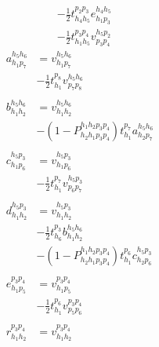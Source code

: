 \documentclass{article}
\begin{document}
{\begin{align}
                        &- \frac{1}{2} t ^{ p_{2} p_{3} } _{ h_{4} h_{5} } e ^{ h_{4} h_{5} } _{ h_{1} p_{3} }\tag{cc2\_t1\_6}\\
                        &- \frac{1}{2} t ^{ p_{3} p_{4} } _{ h_{1} h_{5} } v ^{ h_{5} p_{2} } _{ p_{3} p_{4} }\tag{cc2\_t1\_7}
\end{align}
\newpage
\begin{align}
a ^{ h_{5} h_{6} } _{ h_{1} p_{7} } &= v ^{ h_{5} h_{6} } _{ h_{1} p_{7} }\tag{cc2\_t2\_2\_2\_2\_1}\\
                                    &- \frac{1}{2} t ^{ p_{8} } _{ h_{1} } v ^{ h_{5} h_{6} } _{ p_{7} p_{8} }\tag{cc2\_t2\_2\_2\_2\_2}\\
\nonumber\\
b ^{ h_{5} h_{6} } _{ h_{1} h_{2} } &= v ^{ h_{5} h_{6} } _{ h_{1} h_{2} }\tag{cc2\_t2\_2\_2\_1}\\
                                    &- \left(1- P^{ h_{1} h_{2} p_{3} p_{4}}_{ h_{2} h_{1} p_{3} p_{4}} \right) t ^{ p_{7} } _{ h_{1} } a ^{ h_{5} h_{6} } _{ h_{2} p_{7} }\tag{cc2\_t2\_2\_2\_2}\\
\nonumber\\
c ^{ h_{5} p_{3} } _{ h_{1} p_{6} } &= v ^{ h_{5} p_{3} } _{ h_{1} p_{6} }\tag{cc2\_t2\_2\_3\_1}\\
                                    &- \frac{1}{2} t ^{ p_{7} } _{ h_{1} } v ^{ h_{5} p_{3} } _{ p_{6} p_{7} }\tag{cc2\_t2\_2\_3\_2}\\
\nonumber\\
d ^{ h_{5} p_{3} } _{ h_{1} h_{2} } &= v ^{ h_{5} p_{3} } _{ h_{1} h_{2} }\tag{cc2\_t2\_2\_1}\\
                                    &- \frac{1}{2} t ^{ p_{3} } _{ h_{6} } b ^{ h_{5} h_{6} } _{ h_{1} h_{2} }\tag{cc2\_t2\_2\_2}\\
                                    &- \left(1- P^{ h_{1} h_{2} p_{3} p_{4}}_{ h_{2} h_{1} p_{3} p_{4}} \right) t ^{ p_{6} } _{ h_{1} } c ^{ h_{5} p_{3} } _{ h_{2} p_{6} }\tag{cc2\_t2\_2\_3}\\
\nonumber\\
e ^{ p_{3} p_{4} } _{ h_{1} p_{5} } &= v ^{ p_{3} p_{4} } _{ h_{1} p_{5} }\tag{cc2\_t2\_3\_1}\\
                                    &- \frac{1}{2} t ^{ p_{6} } _{ h_{1} } v ^{ p_{3} p_{4} } _{ p_{5} p_{6} }\tag{cc2\_t2\_3\_2}\\
\nonumber\\
r ^{ p_{3} p_{4} } _{ h_{1} h_{2} } &= v ^{ p_{3} p_{4} } _{ h_{1} h_{2} }\tag{cc2\_t2\_1}\\

\end{align}}
\end{document}
